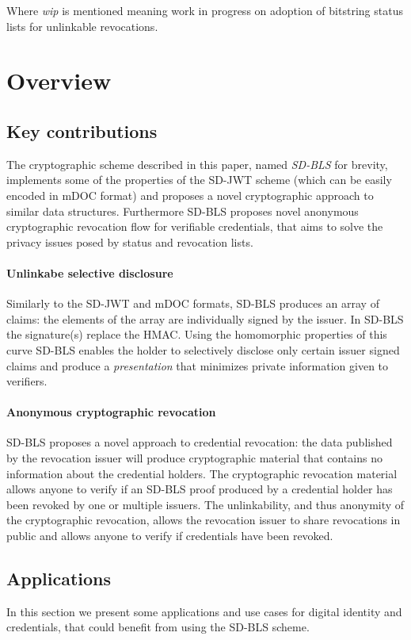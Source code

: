 Where \emph{wip} is mentioned meaning work in progress on adoption of bitstring status lists for unlinkable revocations.

\section{Overview}

\subsection{Key contributions}
The cryptographic scheme described in this paper, named \textit{SD-BLS} for brevity, implements some of the properties of the SD-JWT scheme (which can be easily encoded in mDOC format) and proposes a novel cryptographic approach to similar data structures. Furthermore SD-BLS proposes novel anonymous cryptographic revocation flow for verifiable credentials, that aims to solve the privacy issues posed by status and revocation lists.

\paragraph{Unlinkabe selective disclosure}
Similarly to the SD-JWT and mDOC formats, SD-BLS produces an array of claims:  the elements of the array are individually signed by the issuer. In SD-BLS the signature(s) replace the HMAC. Using the homomorphic properties of this curve SD-BLS enables the holder to selectively disclose only certain issuer signed claims and produce a \textit{presentation} that minimizes private information given to verifiers.

\paragraph{Anonymous cryptographic revocation}
SD-BLS proposes a novel approach to credential revocation: the data published by the revocation issuer will produce cryptographic material that contains no information about the credential holders. The cryptographic revocation material allows anyone to verify if an SD-BLS proof produced by a credential holder has been revoked by one or multiple issuers. The unlinkability, and thus anonymity of the cryptographic revocation,  allows the revocation issuer to share revocations in public and allows anyone to verify if credentials have been revoked.

\subsection{Applications}
In this section we present some applications and use cases for digital identity and credentials, that could benefit from using the SD-BLS scheme.

